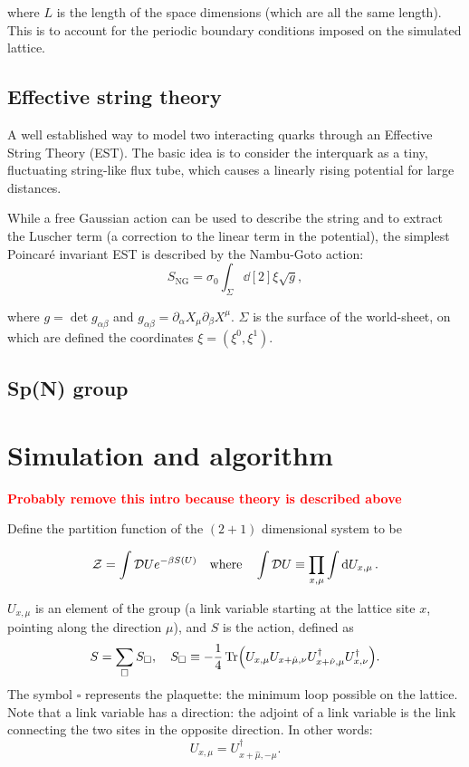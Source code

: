 \documentclass[reqno,12pt]{article}
\numberwithin{equation}{section}
\newcommand{\red}[1]{\textbf{\textcolor{red}{#1}}}
\begin{document}
where $L$ is the length of the space dimensions (which are all the same length). This is to account for the periodic boundary conditions
imposed on the simulated lattice.

\subsection{Effective string theory}

A well established way to model two interacting quarks through an Effective String Theory (EST). The basic idea is to consider the interquark
as a tiny, fluctuating string-like flux tube, which causes a linearly rising potential for large distances.

While a free Gaussian action can be used to describe the string and to extract the Luscher term \cite{caselle}
(a correction to the linear term in the potential), the simplest Poincaré invariant EST is described by the Nambu-Goto action:
\begin{equation}
	S_\text{NG} = \sigma_0 \int_\Sigma \dd[2]\xi \sqrt{g},
\end{equation}

where $g = \det g_{\alpha\beta}$ and $g_{\alpha\beta} = \partial_\alpha X_\mu \partial_\beta X^\mu$. $\Sigma$ is the surface of the
world-sheet, on which are defined the coordinates $\xi = (\xi^0, \xi^1)$.

\subsection{Sp(N) group}

\section{Simulation and algorithm}
\red{Probably remove this intro because theory is described above}

Define the partition function of the $(2+1)$ dimensional system to be

\begin{equation}
	\mathcal{Z} = \int \mathcal{D}U e^{-\beta S(U)} \qq{where} \int \mathcal{D} U \equiv \prod_{x,\mu} \int \dd{U_{x,\mu}}.
\end{equation}

$U_{x,\mu}$ is an element of the group (a link variable starting at the lattice site $x$, pointing
along the direction $\mu$), 
and $S$ is the action, defined as
\begin{equation}
	S = \sum_\square S_\square \qc 
	S_\square \equiv - \frac{1}{4} \Tr(U_{x,\mu}U_{x+\hat{\mu}, \nu}U^\dagger_{x+\hat{\nu}, \mu}U^\dagger_{x,\nu}).
\end{equation}
The symbol $\square$ represents the plaquette: the minimum loop possible on the lattice. Note that a link 
variable has a direction: the adjoint of a link variable is the link connecting the two sites in the opposite
direction. In other words:
\begin{equation}
	U_{x,\mu} = U_{x+\hat{\mu}, -\mu}^\dagger.
\end{equation}
\end{document}
